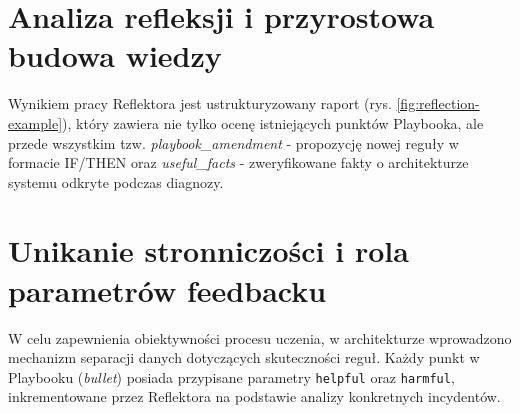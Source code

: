 \begin{center}
    \label{fig:reflector-prompt}
    
\end{center}

\begin{center}
    \label{fig:curator-prompt}
    
\end{center}

\section{Analiza refleksji i przyrostowa budowa wiedzy}

Wynikiem pracy Reflektora jest ustrukturyzowany raport (rys. \ref{fig:reflection-example}), który zawiera nie tylko ocenę istniejących punktów Playbooka, ale przede wszystkim tzw. \textit{playbook\_amendment} - propozycję nowej reguły w formacie IF/THEN oraz \textit{useful\_facts} - zweryfikowane fakty o architekturze systemu odkryte podczas diagnozy.

\begin{center}
    \label{fig:reflection-example}
    
\end{center}

\section{Unikanie stronniczości i rola parametrów feedbacku}

W celu zapewnienia obiektywności procesu uczenia, w architekturze wprowadzono mechanizm separacji danych dotyczących skuteczności reguł. Każdy punkt w Playbooku (\textit{bullet}) posiada przypisane parametry \texttt{helpful} oraz \texttt{harmful}, inkrementowane przez Reflektora na podstawie analizy konkretnych incydentów. 

